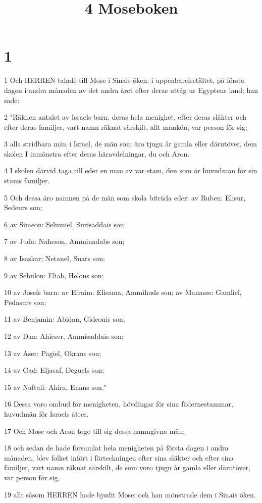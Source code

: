 

\title{4 Moseboken}


\chapter{1}

\par 1 Och HERREN talade till Mose i Sinais öken, i uppenbarelsetältet, på första dagen i andra månaden av det andra året efter deras uttåg ur Egyptens land; han sade:
\par 2 "Räknen antalet av Israels barn, deras hela menighet, efter deras släkter och efter deras familjer, vart namn räknat särskilt, allt mankön, var person för sig;
\par 3 alla stridbara män i Israel, de män som äro tjugu år gamla eller därutöver, dem skolen I inmönstra efter deras häravdelningar, du och Aron.
\par 4 I skolen därvid taga till eder en man av var stam, den som är huvudman för sin stams familjer.
\par 5 Och dessa äro namnen på de män som skola biträda eder: av Ruben: Elisur, Sedeurs son;
\par 6 av Simeon: Selumiel, Surisaddais son;
\par 7 av Juda: Naheson, Amminadabs son;
\par 8 av Isaskar: Netanel, Suars son;
\par 9 av Sebulon: Eliab, Helons son;
\par 10 av Josefs barn: av Efraim: Elisama, Ammihuds son; av Manasse: Gamliel, Pedasurs son;
\par 11 av Benjamin: Abidan, Gideonis son;
\par 12 av Dan: Ahieser, Ammisaddais son;
\par 13 av Aser: Pagiel, Okrans son;
\par 14 av Gad: Eljasaf, Deguels son;
\par 15 av Naftali: Ahira, Enans son."
\par 16 Dessa voro ombud för menigheten, hövdingar för sina fädernestammar, huvudmän för Israels ätter.
\par 17 Och Mose och Aron togo till sig dessa namngivna män;
\par 18 och sedan de hade församlat hela menigheten på första dagen i andra månaden, blev folket infört i förteckningen efter sina släkter och efter sina familjer, vart namn räknat särskilt, de som voro tjugu år gamla eller därutöver, var person för sig,
\par 19 allt såsom HERREN hade bjudit Mose; och han mönstrade dem i Sinais öken.
